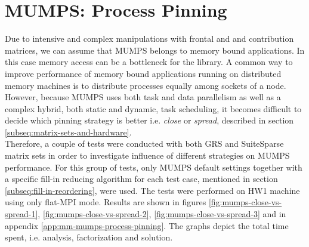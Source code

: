 \section{MUMPS: Process Pinning}
\label{subseq:mm-mumps-process-pinning}

Due to intensive and complex manipulations with frontal and and contribution matrices, we can assume that MUMPS belongs to memory bound applications. In this case memory access can be a bottleneck for the library. A common way to improve performance of memory bound applications running on distributed memory machines is to distribute processes equally among sockets of a node.\\


However, because MUMPS uses both task and data parallelism as well as a complex hybrid, both static and dynamic, task scheduling, it becomes difficult to decide which pinning strategy is better i.e. \textit{close} or \textit{spread}, described in section \ref{subseq:matrix-sets-and-hardware}.\\


Therefore, a couple of tests were conducted with both GRS and SuiteSparse matrix sets in order to investigate influence of different strategies on MUMPS performance. For this group of tests, only MUMPS default settings together with a specific fill-in reducing algorithm for each test case, mentioned in section \ref{subseq:fill-in-reordering}, were used. The tests were performed on HW1 machine using only flat-MPI mode. Results are shown in figures \ref{fig:mumps-close-vs-spread-1}, \ref{fig:mumps-close-vs-spread-2}, \ref{fig:mumps-close-vs-spread-3} and in appendix \ref{app:mm-mumps-process-pinning}. The graphs depict the total time spent, i.e. analysis, factorization and solution.\\

